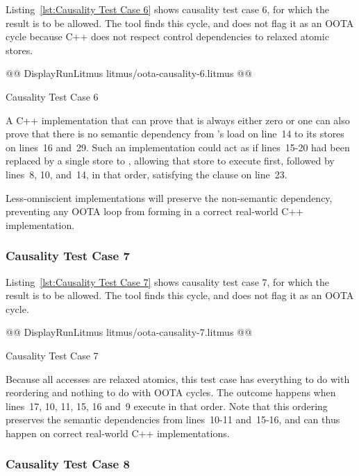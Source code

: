\documentclass[10]{article}
\begin{document}
Listing~\ref{lst:Causality Test Case 6}
shows causality test case 6, for which the 
result is to be allowed.
The  tool finds this cycle, and does not flag it as an OOTA
cycle because C++ does not respect control dependencies to relaxed
atomic stores.

\begin{listing}[tbp]
@@ DisplayRunLitmus litmus/oota-causality-6.litmus @@
\caption{Causality Test Case 6}
\label{lst:Causality Test Case 6}
\end{listing}

A C++ implementation that can prove that  is always either
zero or one can also prove that there is no semantic dependency
from 's load on line~14 to its stores on lines~16 and~29.
Such an implementation could act as if lines~15-20 had been replaced
by a single store to , allowing that store to execute first,
followed by lines~8, 10, and~14, in that order, satisfying the
 clause on line~23.

Less-omniscient implementations will preserve the non-semantic
dependency, preventing any OOTA loop from forming in a correct real-world C++
implementation.

\subsubsection{Causality Test Case 7}
\label{app:Causality Test Case 7}

Listing~\ref{lst:Causality Test Case 7}
shows causality test case 7, for which the 
result is to be allowed.
The  tool finds this cycle, and does not flag it as an OOTA cycle.

\begin{listing}[tbp]
@@ DisplayRunLitmus litmus/oota-causality-7.litmus @@
\caption{Causality Test Case 7}
\label{lst:Causality Test Case 7}
\end{listing}

Because all accesses are relaxed atomics, this test case has everything
to do with reordering and nothing to do with OOTA cycles.
The outcome happens when lines~17, 10, 11, 15, 16 and~9 execute in that
order.
Note that this ordering preserves the semantic dependencies from
lines~10-11 and~15-16, and can thus happen on correct real-world
C++ implementations.

\subsubsection{Causality Test Case 8}
\label{app:Causality Test Case 8}
\end{document}
